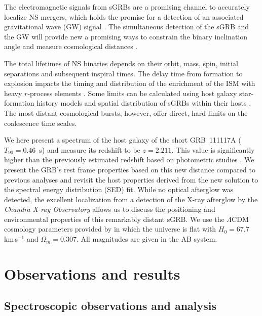 \documentclass{aa}    %
\begin{document}
The electromagnetic signals from sGRBs are a promising channel to accurately
localize NS mergers, which holds the promise for a detection of an associated
gravitational wave (GW) signal \citep{Ghirlanda2016}. The simultaneous detection
of the sGRB and the GW will provide new a promising ways to constrain the binary
inclination angle \citep{Arun2014} and measure cosmological distances
\citep{Nissanke2010}.

The total lifetimes of NS binaries depends on their orbit, mass, spin, initial
separations and subsequent inspiral times. The delay time from formation to
explosion impacts the timing and distribution of the enrichment of the ISM with
heavy $r$-process elements \citep{VandeVoort2015, Wallner2015,  Ji2016}. Some
limits can be calculated using host galaxy star-formation history models and
spatial distribution of sGRBs within their hosts \citep[][]{Berger2014}. The
most distant cosmological bursts, however, offer direct, hard limits on the
coalescence time scales.


We here present a spectrum of the host galaxy of the short
GRB~111117A ($T_{90}=0.46$~s) and measure its redshift to be $z=2.211$. This
value is significantly higher than the previously estimated redshift based on
photometric studies \citep{Margutti2012,Sakamoto2013}. We present the GRB's rest
frame properties based on this new distance compared to previous analyses and
revisit the host properties derived from the new solution to the spectral energy distribution (SED) fit.
While no optical afterglow was detected, the excellent localization from a
detection of the X-ray afterglow by the \emph{Chandra X-ray Observatory}
allows us to discuss the positioning and environmental properties of this
remarkably distant sGRB.
We use the $\Lambda$CDM cosmology parameters provided by
\citet{Planck2015} in which the universe is flat with $H_0 = 67.7$\,km\,s$^{-1}$
and $\Omega_m = 0.307$. All magnitudes are given in the AB system.


\section{Observations and results}

\subsection{Spectroscopic observations and analysis}
\end{document}
